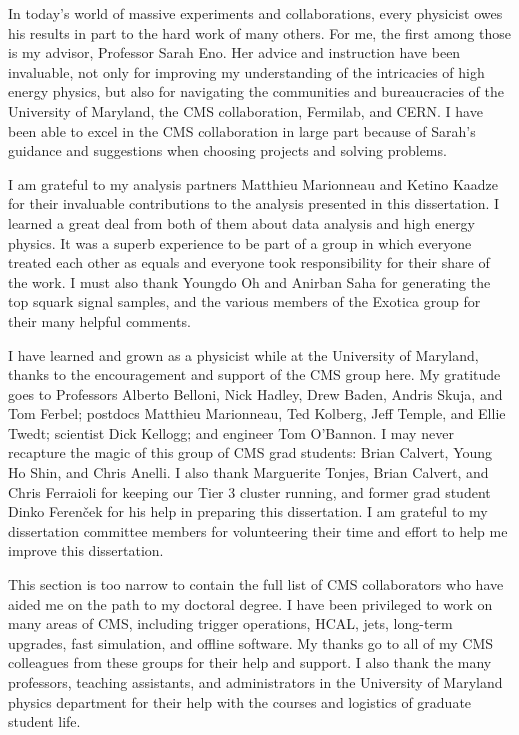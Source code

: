 \documentclass[12pt]{thesis}  %
\begin{document}
\vspace{1ex}

In today's world of massive experiments and collaborations, every physicist owes his results in part to the hard work of many others. For me, the first among those is my advisor, Professor Sarah Eno. Her advice and instruction have been invaluable, not only for improving my understanding of the intricacies of high energy physics, but also for navigating the communities and bureaucracies of the University of Maryland, the CMS collaboration, Fermilab, and CERN. I have been able to excel in the CMS collaboration in large part because of Sarah's guidance and suggestions when choosing projects and solving problems.

I am grateful to my analysis partners Matthieu Marionneau and Ketino Kaadze for their invaluable contributions to the analysis presented in this dissertation. I learned a great deal from both of them about data analysis and high energy physics. It was a superb experience to be part of a group in which everyone treated each other as equals and everyone took responsibility for their share of the work. I must also thank Youngdo Oh and Anirban Saha for generating the top squark signal samples, and the various members of the Exotica group for their many helpful comments.

I have learned and grown as a physicist while at the University of Maryland, thanks to the encouragement and support of the CMS group here. My gratitude goes to Professors Alberto Belloni, Nick Hadley, Drew Baden, Andris Skuja, and Tom Ferbel; postdocs Matthieu Marionneau, Ted Kolberg, Jeff Temple, and Ellie Twedt; scientist Dick Kellogg; and engineer Tom O'Bannon. I may never recapture the magic of this group of CMS grad students: Brian Calvert, Young Ho Shin, and Chris Anelli. I also thank Marguerite Tonjes, Brian Calvert, and Chris Ferraioli for keeping our Tier 3 cluster running, and former grad student Dinko Feren\v{c}ek for his help in preparing this dissertation. I am grateful to my dissertation committee members for volunteering their time and effort to help me improve this dissertation.

This section is too narrow to contain the full list of CMS collaborators who have aided me on the path to my doctoral degree. I have been privileged to work on many areas of CMS, including trigger operations, HCAL, jets, long-term upgrades, fast simulation, and offline software. My thanks go to all of my CMS colleagues from these groups for their help and support. I also thank the many professors, teaching assistants, and administrators in the University of Maryland physics department for their help with the courses and logistics of graduate student life.
\end{document}

